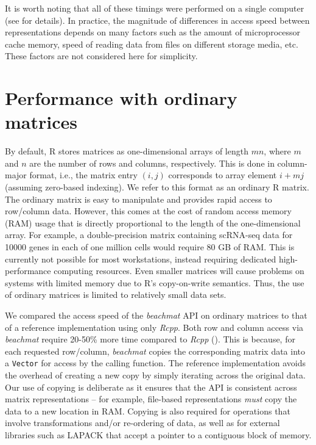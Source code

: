 \documentclass{article}
\newcommand{\beachmat}{\textit{beachmat}}
\newcommand{\code}[1]{\texttt{#1}}
\begin{document}
It is worth noting that all of these timings were performed on a single computer (see \suppsecrealsystem{} for details). 
In practice, the magnitude of differences in access speed between representations depends on many factors such as the amount of microprocessor cache memory, speed of reading data from files on different storage media, etc.
These factors are not considered here for simplicity.

\section{Performance with ordinary matrices}
By default, R stores matrices as one-dimensional arrays of length $mn$, where $m$ and $n$ are the number of rows and columns, respectively.
This is done in column-major format, i.e., the matrix entry $(i, j)$ corresponds to array element $i + mj$ (assuming zero-based indexing).
We refer to this format as an ordinary R matrix.
The ordinary matrix is easy to manipulate and provides rapid access to row/column data.
However, this comes at the cost of random access memory (RAM) usage that is directly proportional to the length of the one-dimensional array.
For example, a double-precision matrix containing scRNA-seq data for 10000 genes in each of one million cells would require 80 GB of RAM.
This is currently not possible for most workstations, instead requiring dedicated high-performance computing resources.
Even smaller matrices will cause problems on systems with limited memory due to R's copy-on-write semantics.
Thus, the use of ordinary matrices is limited to relatively small data sets.


We compared the access speed of the \beachmat{} API on ordinary matrices to that of a reference implementation using only \textit{Rcpp}.
Both row and column access via \beachmat{} require 20-50\% more time compared to \textit{Rcpp} (\suppfigsimpleaccess{}).
This is because, for each requested row/column, \beachmat{} copies the corresponding matrix data into a \code{Vector} for access by the calling function.
The reference implementation avoids the overhead of creating a new copy by simply iterating across the original data.
Our use of copying is deliberate as it ensures that the API is consistent across matrix representations -- for example, file-based representations \textit{must} copy the data to a new location in RAM.
Copying is also required for operations that involve transformations and/or re-ordering of data, as well as for external libraries such as LAPACK that accept a pointer to a contiguous block of memory.
\end{document}
